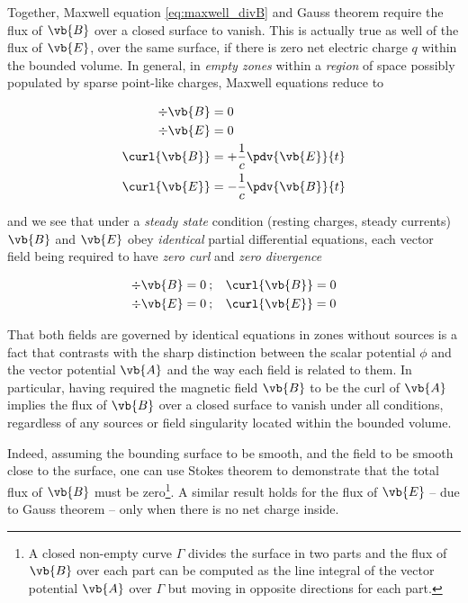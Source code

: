 Together, Maxwell equation \ref{eq:maxwell_divB} and Gauss theorem require the flux of $\vb{B}$ over a closed surface to vanish.  This is actually true as well of the flux of $\vb{E}$, over the same surface, if there is zero net electric charge $q$ within the bounded volume. In general, in \textit{empty zones} within a \textit{region} of space possibly populated by sparse point-like charges, Maxwell equations reduce to 

\begin{equation}
\begin{aligned}
\div{\vb{B}} &= 0 \\
\div{\vb{E}} &= 0 \\
\curl{\vb{B}} &= + \frac{1}{c} \pdv{\vb{E}}{t} \\
\curl{\vb{E}} &= - \frac{1}{c} \pdv{\vb{B}}{t}
\end{aligned}
\label{eq:emptyMaxwell}
\end{equation}

and we see that under a \textit{steady state} condition (resting charges, steady currents) $\vb{B}$ and $\vb{E}$ obey \textit{identical} partial differential equations, each vector field being required to have \textit{zero curl} and \textit{zero divergence}


\begin{equation}
\begin{aligned}
\div{\vb{B}} &= 0 \:;\:\:\:\: \curl{\vb{B}} = 0 \\
\div{\vb{E}} &= 0 \:;\:\:\:\: \curl{\vb{E}} = 0 
\end{aligned}
\label{eq:emptySteadyMaxwell}
\end{equation}

That both fields are governed by identical equations in zones without sources is a fact that contrasts with the sharp distinction between the scalar potential $\phi$ and the vector potential $\vb{A}$ and the way each field is related to them. In particular, having required the magnetic field $\vb{B}$ to be the curl of $\vb{A}$ implies the flux of $\vb{B}$ over a closed surface to vanish under all conditions, regardless of any sources or field singularity located within the bounded volume. 

Indeed, assuming the bounding surface to be smooth, and the field to be smooth close to the surface, one can use Stokes theorem to demonstrate that the total flux of $\vb{B}$ must be zero\footnote{A closed non-empty curve $\Gamma$ divides the surface in two parts and the flux of $\vb{B}$ over each part can be computed as the line integral of the vector potential $\vb{A}$ over $\Gamma$ but moving in opposite directions for each part.}. 
A similar result holds for the flux of $\vb{E}$ -- due to Gauss theorem -- only when there is no net charge inside.

